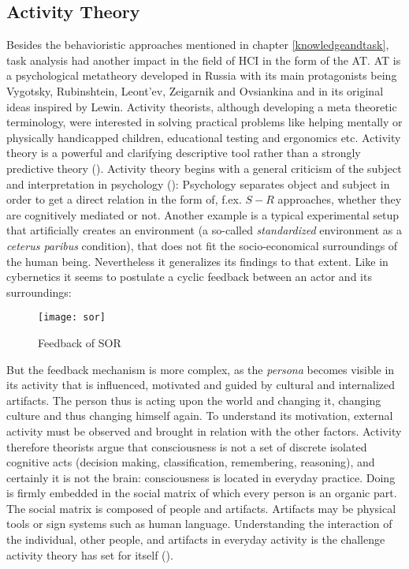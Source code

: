 \subsection{Activity Theory}
Besides the behavioristic approaches mentioned in chapter \ref{knowledgeandtask}, task analysis had another impact in the field of \ac{HCI} in the form of the \ac{AT}. \acs{AT} is a psychological metatheory developed in Russia with its main protagonists being Vygotsky, Rubinshtein, Leont'ev, Zeigarnik and Ovsiankina  and in its original ideas inspired by Lewin. Activity theorists, although developing a meta theoretic terminology, were interested in solving practical problems like helping mentally or physically handicapped children, educational testing and ergonomics etc. Activity theory is a powerful and clarifying descriptive tool rather than a strongly predictive theory (\cite{nardi1996activity}). Activity theory begins with a general criticism of the subject and interpretation in psychology (\cite{leont1974problem}): Psychology separates object and subject in order to get a direct relation in the form of, f.ex. $S-R$ approaches, whether they are cognitively mediated or not. Another example is a typical experimental setup that artificially creates an environment (a so-called \textit{standardized} environment as a \textit{ceterus paribus} condition), that does not fit the socio-economical surroundings of the human being. Nevertheless it generalizes its findings to that extent. Like in cybernetics it seems to postulate a cyclic feedback between an actor and its surroundings: 

\begin{figure}[ht]
	\centering
  \texttt{[image: sor]}
	\caption{Feedback of SOR}
	\label{fig2}
\end{figure}

But the feedback mechanism is more complex, as the \textit{persona} becomes visible in its activity that is influenced, motivated and guided by cultural and internalized artifacts. The person thus is acting upon the world and changing it, changing culture and thus changing himself again. To understand its motivation, external activity must be observed and brought in relation with the other factors. Activity therefore theorists argue that consciousness is not a set of discrete isolated cognitive acts (decision making, classification, remembering, reasoning), and certainly it is not the brain: consciousness is located in everyday practice. Doing is firmly embedded in the social matrix of which every person is an organic part. The social matrix is composed of people and artifacts. Artifacts may be physical tools or sign systems such as human language. Understanding the interaction of the individual, other people, and artifacts in everyday activity is the challenge activity theory has set for itself (\cite{nardi1996activity}).


